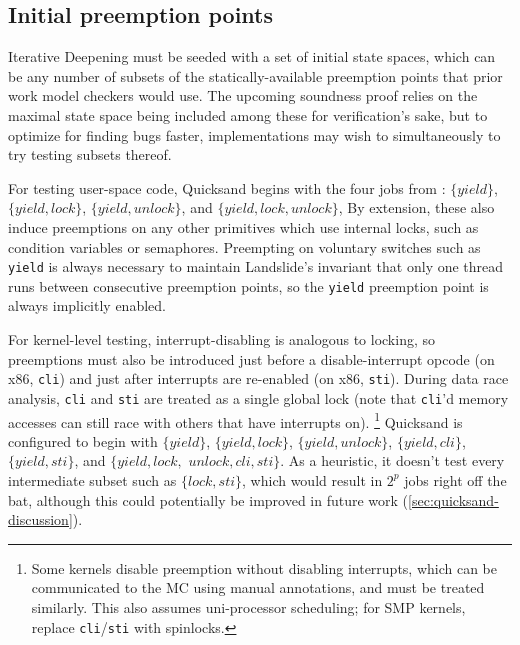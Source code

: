 
\subsection{Initial preemption points}
\label{sec:quicksand-initial-pps}

Iterative Deepening must be seeded with a set of initial state spaces,
which can be any number of subsets of the statically-available preemption points
that prior work model checkers would use.
The upcoming soundness proof relies on the maximal state space being included among these for verification's sake,
but to optimize for finding bugs faster,
implementations may wish to simultaneously to try testing subsets thereof.

For testing user-space code, Quicksand begins with the four jobs from :
$\{yield\}$,
$\{yield,lock\}$,
$\{yield,unlock\}$,
and $\{yield,lock,unlock\}$,
By extension, these also induce preemptions on any other primitives
which use
internal locks,
such as condition variables or semaphores.
Preempting on voluntary switches such as {\tt yield} is always necessary to maintain
Landslide's invariant that only one thread runs between consecutive preemption points,
so the {\tt yield} preemption point is always implicitly enabled.

For kernel-level testing, interrupt-disabling is analogous to locking,
so preemptions must also be introduced
just before a disable-interrupt opcode (on x86, {\tt cli})
and just after interrupts are re-enabled (on x86, {\tt sti}).
During data race analysis, {\tt cli} and {\tt sti} are treated as a single global lock
(note that {\tt cli}'d memory accesses can still race with others that have interrupts on).%
\footnote{Some kernels disable preemption without disabling interrupts,
which can be communicated to the MC using manual annotations,
and must be treated similarly.
This also assumes uni-processor scheduling; for SMP kernels, replace {\tt cli}/{\tt sti} with spinlocks.}
Quicksand is configured to begin with
$\{yield\}$,
$\{yield,lock\}$,
$\{yield,unlock\}$,
$\{yield,cli\}$,
$\{yield,sti\}$,
and $\{yield,lock,$ $unlock,cli,sti\}$.
As a heuristic, it doesn't test every intermediate subset such as $\{lock,sti\}$,
which would result in $2^p$ jobs right off the bat,
although this could potentially be improved in future work (\cref{sec:quicksand-discussion}).


